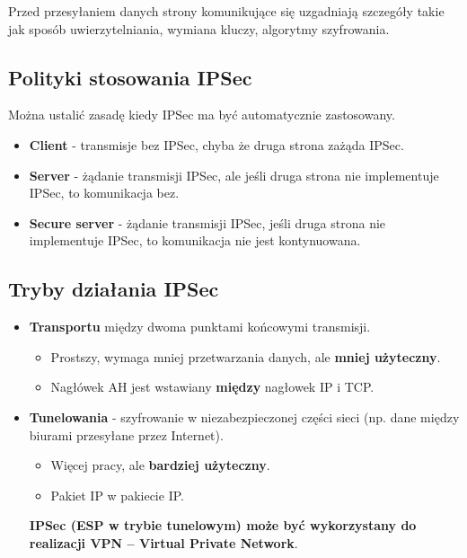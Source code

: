 \documentclass[../sk-egzamin.tex]{subfiles}
\begin{document}
Przed przesyłaniem danych strony komunikujące się uzgadniają szczegóły takie
jak sposób uwierzytelniania, wymiana kluczy, algorytmy szyfrowania.

\subsection*{Polityki stosowania IPSec}
Można ustalić zasadę kiedy IPSec ma być automatycznie zastosowany.

\begin{itemize}
    \item \textbf{Client}  - transmisje bez IPSec,
    chyba że druga strona zażąda IPSec.
    \item \textbf{Server}  - żądanie transmisji IPSec,
    ale jeśli druga strona nie implementuje IPSec, to komunikacja bez.
    \item \textbf{Secure server}  - żądanie transmisji
    IPSec, jeśli druga strona nie implementuje IPSec, to komunikacja nie jest
    kontynuowana.
\end{itemize}


\subsection*{Tryby działania IPSec }
\begin{itemize}
    \item \textbf{Transportu} 
    między dwoma punktami końcowymi transmisji.
    \begin{itemize}
        \item Prostszy,
        wymaga mniej przetwarzania danych, ale \textbf{mniej użyteczny}.
        \item Nagłówek AH jest wstawiany \textbf{między} nagłowek IP i TCP.
    \end{itemize}
    \item \textbf{Tunelowania} -
    szyfrowanie w niezabezpieczonej części sieci (np. dane między
    biurami przesyłane przez Internet).
    \begin{itemize}
        \item Więcej pracy, ale \textbf{bardziej użyteczny}.
        \item Pakiet IP w pakiecie IP.
    \end{itemize}

    \textbf{IPSec (ESP w trybie tunelowym) może być wykorzystany do realizacji
    VPN – Virtual Private Network}.
\end{itemize}
\end{document}
